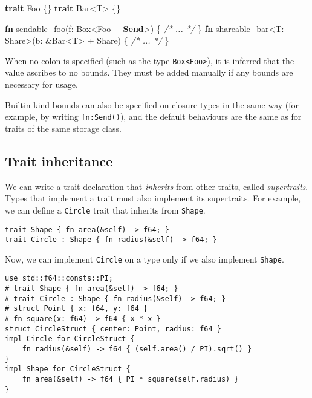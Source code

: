 \documentclass[]{article}
\newenvironment{Shaded}{}{}
\newcommand{\KeywordTok}[1]{\textcolor[rgb]{0.00,0.44,0.13}{\textbf{{#1}}}}
\newcommand{\CommentTok}[1]{\textcolor[rgb]{0.38,0.63,0.69}{\textit{{#1}}}}
\newcommand{\NormalTok}[1]{{#1}}
\begin{document}
\begin{Shaded}
\begin{Highlighting}[]
\KeywordTok{trait} \NormalTok{Foo \{\}}
\KeywordTok{trait} \NormalTok{Bar<T> \{\}}

\KeywordTok{fn} \NormalTok{sendable_foo(f: Box<Foo + }\KeywordTok{Send}\NormalTok{>) \{ }\CommentTok{/* ... */} \NormalTok{\}}
\KeywordTok{fn} \NormalTok{shareable_bar<T: Share>(b: &Bar<T> + Share) \{ }\CommentTok{/* ... */} \NormalTok{\}}
\end{Highlighting}
\end{Shaded}

When no colon is specified (such as the type
\texttt{Box\textless{}Foo\textgreater{}}), it is inferred that the value
ascribes to no bounds. They must be added manually if any bounds are
necessary for usage.

Builtin kind bounds can also be specified on closure types in the same
way (for example, by writing \texttt{fn:Send()}), and the default
behaviours are the same as for traits of the same storage class.

\subsection{Trait inheritance}\label{trait-inheritance}

We can write a trait declaration that \emph{inherits} from other traits,
called \emph{supertraits}. Types that implement a trait must also
implement its supertraits. For example, we can define a \texttt{Circle}
trait that inherits from \texttt{Shape}.

\begin{verbatim}
trait Shape { fn area(&self) -> f64; }
trait Circle : Shape { fn radius(&self) -> f64; }
\end{verbatim}

Now, we can implement \texttt{Circle} on a type only if we also
implement \texttt{Shape}.

\begin{verbatim}
use std::f64::consts::PI;
# trait Shape { fn area(&self) -> f64; }
# trait Circle : Shape { fn radius(&self) -> f64; }
# struct Point { x: f64, y: f64 }
# fn square(x: f64) -> f64 { x * x }
struct CircleStruct { center: Point, radius: f64 }
impl Circle for CircleStruct {
    fn radius(&self) -> f64 { (self.area() / PI).sqrt() }
}
impl Shape for CircleStruct {
    fn area(&self) -> f64 { PI * square(self.radius) }
}
\end{verbatim}
\end{document}
